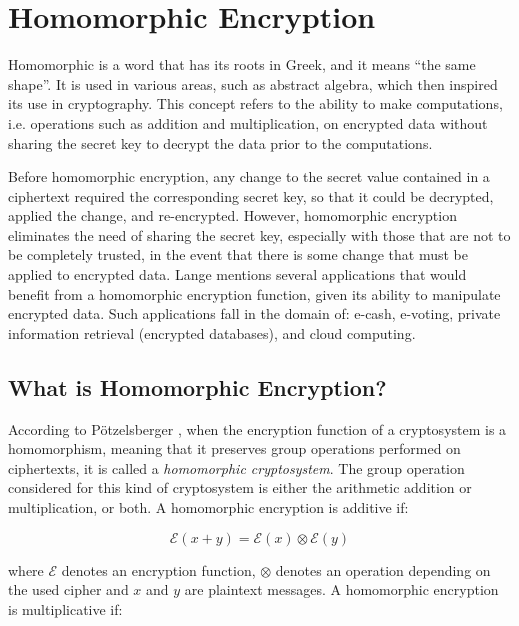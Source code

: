\section{Homomorphic Encryption}

Homomorphic is a word that has its roots in Greek, and it means ``the same shape''. It is used in various areas, such as abstract algebra, which then inspired its use in cryptography. This concept refers to the ability to make computations, i.e. operations such as addition and multiplication, on encrypted data without sharing the secret key to decrypt the data prior to the computations. 

Before homomorphic encryption, any change to the secret value contained in a ciphertext required the corresponding secret key, so that it could be decrypted, applied the change, and re-encrypted. However, homomorphic encryption eliminates the need of sharing the secret key, especially with those that are not to be completely trusted, in the event that there is some change that must be applied to encrypted data. 
Lange \cite{lange2011} mentions several applications that would benefit from a homomorphic encryption function, given its ability to manipulate encrypted data. Such applications fall in the domain of: e-cash, e-voting, private information retrieval (encrypted databases), and cloud computing.

\subsection{What is Homomorphic Encryption?}
According to P{\"o}tzelsberger \cite{potzelsberger2013kv}, when the encryption function of a cryptosystem is a homomorphism, meaning that it preserves group operations performed on ciphertexts, it is called a \emph{homomorphic cryptosystem}. The group operation considered for this kind of cryptosystem is either the arithmetic addition or multiplication, or both. A homomorphic encryption is additive if:


\[
\mathcal{E}(x+y) = \mathcal{E}(x)\otimes \mathcal{E}(y)
\]

where $\mathcal{E}$ denotes an encryption function, $\otimes$ denotes an operation depending on the used cipher and $x$ and $y$ are plaintext messages. A homomorphic encryption is multiplicative if:

